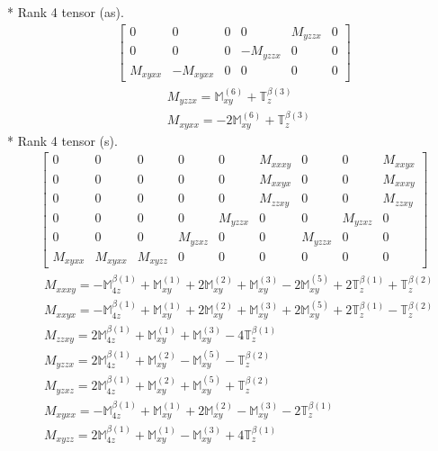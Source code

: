 \documentclass[fleqn,8pt,landscape]{jsarticle}
\begin{document}
* Rank 4 tensor (as).
\begin{align*}
\begin{bmatrix} 0 & 0 & 0 & 0 & M_{yzzx} & 0 \\ 0 & 0 & 0 & - M_{yzzx} & 0 & 0 \\ M_{xyxx} & - M_{xyxx} & 0 & 0 & 0 & 0 \end{bmatrix}
\end{align*}
\begin{align*}
& M_{yzzx} = \mathbb{M}_{xy}^{(6)} + \mathbb{T}_{z}^{\beta(3)} \\
& M_{xyxx} = - 2 \mathbb{M}_{xy}^{(6)} + \mathbb{T}_{z}^{\beta(3)}
\end{align*}
* Rank 4 tensor (s).
\begin{align*}
\begin{bmatrix} 0 & 0 & 0 & 0 & 0 & M_{xxxy} & 0 & 0 & M_{xxyx} \\ 0 & 0 & 0 & 0 & 0 & M_{xxyx} & 0 & 0 & M_{xxxy} \\ 0 & 0 & 0 & 0 & 0 & M_{zzxy} & 0 & 0 & M_{zzxy} \\ 0 & 0 & 0 & 0 & M_{yzzx} & 0 & 0 & M_{yzxz} & 0 \\ 0 & 0 & 0 & M_{yzxz} & 0 & 0 & M_{yzzx} & 0 & 0 \\ M_{xyxx} & M_{xyxx} & M_{xyzz} & 0 & 0 & 0 & 0 & 0 & 0 \end{bmatrix}
\end{align*}
\begin{align*}
& M_{xxxy} = - \mathbb{M}_{4z}^{\beta(1)} + \mathbb{M}_{xy}^{(1)} + 2 \mathbb{M}_{xy}^{(2)} + \mathbb{M}_{xy}^{(3)} - 2 \mathbb{M}_{xy}^{(5)} + 2 \mathbb{T}_{z}^{\beta(1)} + \mathbb{T}_{z}^{\beta(2)} \\
& M_{xxyx} = - \mathbb{M}_{4z}^{\beta(1)} + \mathbb{M}_{xy}^{(1)} + 2 \mathbb{M}_{xy}^{(2)} + \mathbb{M}_{xy}^{(3)} + 2 \mathbb{M}_{xy}^{(5)} + 2 \mathbb{T}_{z}^{\beta(1)} - \mathbb{T}_{z}^{\beta(2)} \\
& M_{zzxy} = 2 \mathbb{M}_{4z}^{\beta(1)} + \mathbb{M}_{xy}^{(1)} + \mathbb{M}_{xy}^{(3)} - 4 \mathbb{T}_{z}^{\beta(1)} \\
& M_{yzzx} = 2 \mathbb{M}_{4z}^{\beta(1)} + \mathbb{M}_{xy}^{(2)} - \mathbb{M}_{xy}^{(5)} - \mathbb{T}_{z}^{\beta(2)} \\
& M_{yzxz} = 2 \mathbb{M}_{4z}^{\beta(1)} + \mathbb{M}_{xy}^{(2)} + \mathbb{M}_{xy}^{(5)} + \mathbb{T}_{z}^{\beta(2)} \\
& M_{xyxx} = - \mathbb{M}_{4z}^{\beta(1)} + \mathbb{M}_{xy}^{(1)} + 2 \mathbb{M}_{xy}^{(2)} - \mathbb{M}_{xy}^{(3)} - 2 \mathbb{T}_{z}^{\beta(1)} \\
& M_{xyzz} = 2 \mathbb{M}_{4z}^{\beta(1)} + \mathbb{M}_{xy}^{(1)} - \mathbb{M}_{xy}^{(3)} + 4 \mathbb{T}_{z}^{\beta(1)}
\end{align*}
\end{document}
